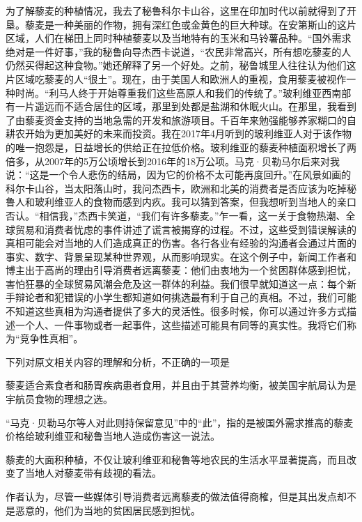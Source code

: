 \documentclass{exam-zh}
\begin{document}
\begin{material}[source={（摘编自赫克托·麦克唐纳《后真相时代》，刘清山译）}]
为了解藜麦的种植情况，我去了秘鲁科尔卡山谷，这里在印加时代以前就得到了开垦。藜麦是一种美丽的作物，拥有深红色或金黄色的巨大种球。在安第斯山的这片区域，人们在梯田上同时种植藜麦以及当地特有的玉米和马铃薯品种。“国外需求绝对是一件好事，”我的秘鲁向导杰西卡说道，“农民非常高兴，所有想吃藜麦的人仍然买得起这种食物。”她还解释了另一个好处。之前，秘鲁城里人往往认为他们这片区域吃藜麦的人“很土”。现在，由于美国人和欧洲人的重视，食用藜麦被视作一种时尚。“利马人终于开始尊重我们这些高原人和我们的传统了。”玻利维亚西南部有一片遥远而不适合居住的区域，那里到处都是盐湖和休眠火山。在那里，我看到了由藜麦资金支持的当地急需的开发和旅游项目。千百年来勉强能够养家糊口的自耕农开始为更加美好的未来而投资。我在2017年4月听到的玻利维亚人对于该作物的唯一抱怨是，日益增长的供给正在拉低价格。玻利维亚的藜麦种植面积增长了两倍多，从2007年的5万公顷增长到2016年的18万公项。马克·贝勒马尔后来对我说：“这是一个令人悲伤的结局，因为它的价格不太可能再度回升。”在风景如画的科尔卡山谷，当太阳落山时，我问杰西卡，欧洲和北美的消费者是否应该为吃掉秘鲁人和玻利维亚人的食物而感到内疚。我可以猜到答案，但我想听到当地人的亲口否认。“相信我，”杰西卡笑道，“我们有许多藜麦。”乍一看，这一关于食物热潮、全球贸易和消费者忧虑的事件讲述了谎言被揭穿的过程。不过，这些受到错误解读的真相可能会对当地的人们造成真正的伤害。各行各业有经验的沟通者会通过片面的事实、数字、背景呈现某种世界观，从而影响现实。在这个例子中，新闻工作者和博主出于高尚的理由引导消费者远离藜麦：他们由衷地为一个贫困群体感到担忧，害怕狂暴的全球贸易风潮会危及这一群体的利益。我们很早就知道这一点：每个新手辩论者和犯错误的小学生都知道如何挑选最有利于自己的真相。不过，我们可能不知道这些真相为沟通者提供了多大的灵活性。很多时候，你可以通过许多方式描述一个人、一件事物或者一起事件，这些描述可能具有同等的真实性。我将它们称为“竞争性真相”。

\end{material}

\begin{question}[points = 3]
    下列对原文相关内容的理解和分析，不正确的一项是\paren
    
    \begin{choices}
        \item 藜麦适合素食者和肠胃疾病患者食用，并且由于其营养均衡，被美国宇航局认为是宇航员食物的理想之选。
        \item “马克·贝勒马尔等人对此则持保留意见”中的“此”，指的是被国外需求推高的藜麦价格给玻利维亚和秘鲁当地人造成伤害这一说法。
        \item 藜麦的大面积种植，不仅让玻利维亚和秘鲁等地农民的生活水平显著提高，而且改变了当地人对藜麦带有歧视的看法。
        \item 作者认为，尽管一些媒体引导消费者远离藜麦的做法值得商榷，但是其出发点却不是恶意的，他们为当地的贫困居民感到担忧。
    \end{choices}
\end{question}
\end{document}
